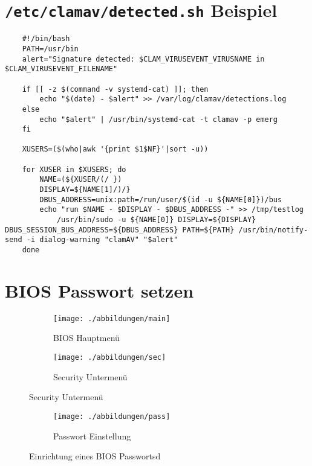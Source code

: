 \newpage
\section{\texttt{/etc/clamav/detected.sh} Beispiel}
\begin{lstlisting}
	#!/bin/bash
	PATH=/usr/bin
	alert="Signature detected: $CLAM_VIRUSEVENT_VIRUSNAME in $CLAM_VIRUSEVENT_FILENAME"
	
	if [[ -z $(command -v systemd-cat) ]]; then
		echo "$(date) - $alert" >> /var/log/clamav/detections.log
	else
		echo "$alert" | /usr/bin/systemd-cat -t clamav -p emerg
	fi
	
	XUSERS=($(who|awk '{print $1$NF}'|sort -u))
	
	for XUSER in $XUSERS; do
		NAME=(${XUSER/(/ })
		DISPLAY=${NAME[1]/)/}
		DBUS_ADDRESS=unix:path=/run/user/$(id -u ${NAME[0]})/bus
		echo "run $NAME - $DISPLAY - $DBUS_ADDRESS -" >> /tmp/testlog 
			/usr/bin/sudo -u ${NAME[0]} DISPLAY=${DISPLAY} DBUS_SESSION_BUS_ADDRESS=${DBUS_ADDRESS} PATH=${PATH} /usr/bin/notify-send -i dialog-warning "clamAV" "$alert"
	done
\end{lstlisting}

\newpage
\section{\ac{BIOS} Passwort setzen}
\begin{figure}[!h]
	\centering
	\begin{subfigure}{.85\textwidth}
		\centering
		\texttt{[image: ./abbildungen/main]}
		\caption{\ac{BIOS} Hauptmenü}
		\label{fig:main}
	\end{subfigure}

\vspace{1.5cm}

	\begin{subfigure}{.85\textwidth}
		\centering
		\texttt{[image: ./abbildungen/sec]}
		\caption{Security Untermenü}
		\label{fig:sec}
	\end{subfigure}
\end{figure}

\begin{figure}[T]
	\ContinuedFloat
	\centering
	\begin{subfigure}{.85\textwidth}
		\centering
		\texttt{[image: ./abbildungen/pass]}
		\caption{Passwort Einstellung}
		\label{fig:pass}
	\end{subfigure}
\caption{Einrichtung eines \ac{BIOS} Passwortsd}
\label{fig:bios}
\end{figure}